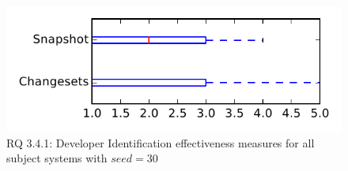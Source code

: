 
\begin{figure}
\centering
\includegraphics[height=0.4\textheight]{figures/dit_seed/rq1_tiny_30}
\caption{RQ 3.4.1: Developer Identification effectiveness measures for all subject systems with $seed=30$}
\label{fig:dit_seed:rq1:tiny}
\end{figure}
